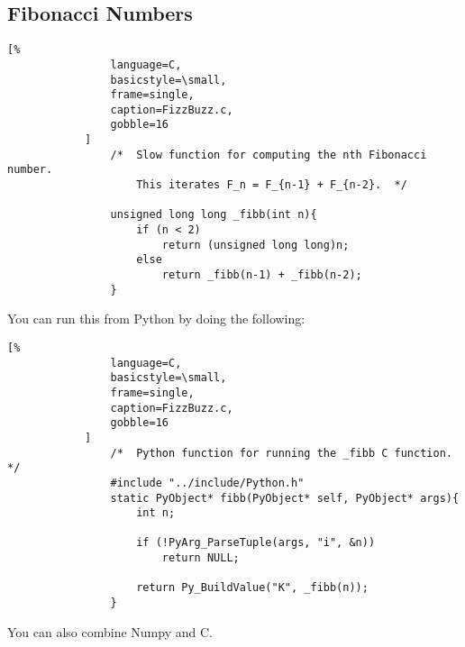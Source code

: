 \documentclass[crop=false,class=book,oneside]{standalone}
\begin{document}
        \subsection{Fibonacci Numbers}
            \begin{lstlisting}[%
                language=C,
                basicstyle=\small,
                frame=single,
                caption=FizzBuzz.c,
                gobble=16
            ]
                /*  Slow function for computing the nth Fibonacci number.
                    This iterates F_n = F_{n-1} + F_{n-2}.  */
    
                unsigned long long _fibb(int n){
                    if (n < 2)
                        return (unsigned long long)n;
                    else
                        return _fibb(n-1) + _fibb(n-2);
                }
            \end{lstlisting}
            You can run this from Python by doing the following:
            \newpage
            \begin{lstlisting}[%
                language=C,
                basicstyle=\small,
                frame=single,
                caption=FizzBuzz.c,
                gobble=16
            ]
                /*  Python function for running the _fibb C function.   */
                #include "../include/Python.h"
                static PyObject* fibb(PyObject* self, PyObject* args){
                    int n;
                
                    if (!PyArg_ParseTuple(args, "i", &n))
                        return NULL;
                
                    return Py_BuildValue("K", _fibb(n));
                }
            \end{lstlisting}
            You can also combine Numpy and C.
\end{document}
